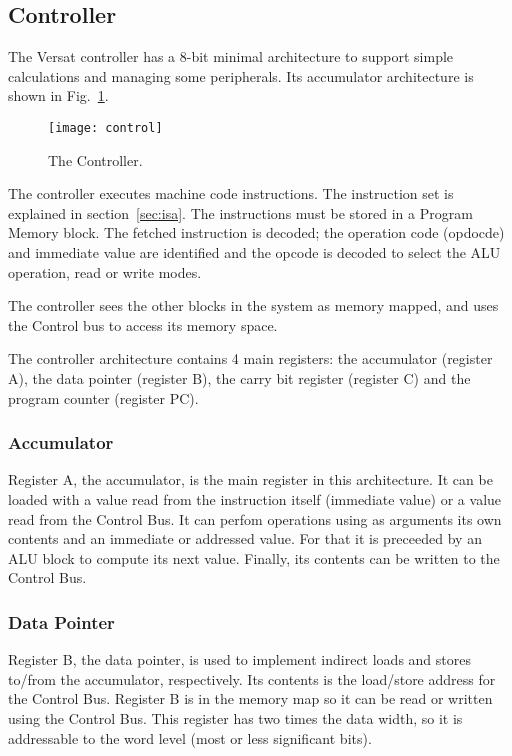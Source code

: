 \subsection{Controller}

The Versat controller has a 8-bit minimal architecture to support
simple calculations and managing some peripherals. Its accumulator
architecture is shown in Fig.~\ref{fig:control}.

\begin{figure}[!htbp]
    \centerline{\texttt{[image: control]}}
    \vspace{0cm}\caption{The Controller.}
    \label{fig:control}
\end{figure}

The controller executes machine code instructions. The instruction set
is explained in section~\ref{sec:isa}. The instructions must be stored in
a Program Memory block. The fetched instruction is decoded; the
operation code (opdocde) and immediate value are identified and the
opcode is decoded to select the ALU operation, read or write modes.

The controller sees the other blocks in the system as memory mapped,
and uses the Control bus to access its memory space.

The controller architecture contains 4 main registers: the accumulator
(register A), the data pointer (register B), the carry bit register
(register C) and the program counter (register PC).

\subsubsection{Accumulator}

Register A, the accumulator, is the main register in this
architecture. It can be loaded with a value read from the instruction
itself (immediate value) or a value read from the Control Bus. It can
perfom operations using as arguments its own contents and an immediate
or addressed value. For that it is preceeded by an ALU block to
compute its next value. Finally, its contents can be written to the
Control Bus.

\subsubsection{Data Pointer}

Register B, the data pointer, is used to implement indirect loads and
stores to/from the accumulator, respectively. Its contents is the
load/store address for the Control Bus. Register B is in the memory
map so it can be read or written using the Control Bus. This register
has two times the data width, so it is addressable to the word level
(most or less significant bits).

